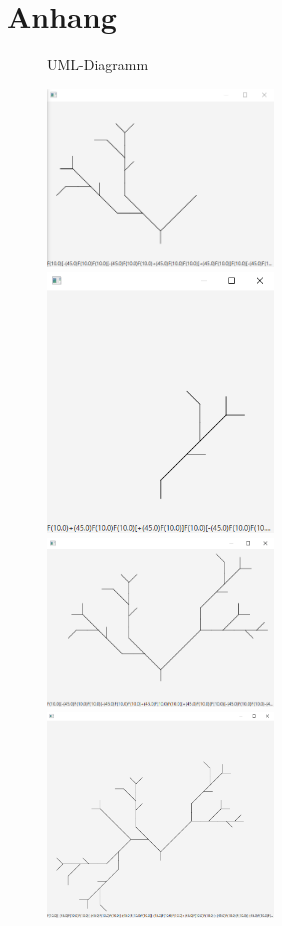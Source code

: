 
\chapter{Anhang}

\begin{figure}[H]

    \caption{UML-Diagramm}
    \label{uml}
\end{figure}

\begin{figure}[H]
    \includegraphics[width=6cm]{../images/example_1.png}
    \includegraphics[width=6cm]{../images/example_2.png}
    \includegraphics[width=6cm]{../images/example_3.png}
    \includegraphics[width=6cm]{../images/example_4.png}

\end{figure}
